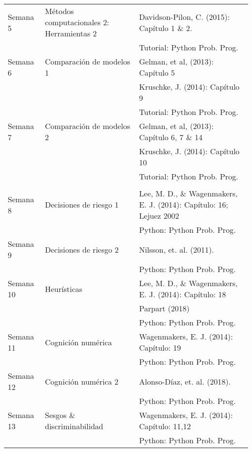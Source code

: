 \documentclass[letterpaper]{inzane_syllabus} %
\begin{document}
\begin{center}
\begin{tabularx}{\textwidth}{p{2cm}p{8cm}p{9.5cm}}
\arrayrulecolor{maingray}\hline
Semana 5 & Métodos computacionales 2: Herramientas 2  & Davidson-Pilon, C. (2015): Capítulo 1 \& 2. \\ &  & Tutorial:  Python Prob. Prog. \\ 

\arrayrulecolor{maingray}\hline
Semana 6 &  Comparaci\'on de modelos 1  & Gelman, et al, (2013): Cap\'itulo 5 \\ & & Kruschke, J. (2014): Cap\'itulo 9 \\  & & Tutorial: Python Prob. Prog. \\

\arrayrulecolor{maingray}\hline
Semana 7 & Comparaci\'on de modelos 2 & Gelman, et al, (2013): Cap\'itulo 6, 7 \& 14 \\ & & Kruschke, J. (2014): Cap\'itulo 10 \\ & & Tutorial:  Python Prob. Prog. \\


 \arrayrulecolor{myCOLOR}\hline
\multicolumn{2}{l}{\textbf{\textcolor{myCOLOR}{\large MODULO 2:  Cognici\'on Bayesiana }}} \\
\hline
 Semana 8 & Decisiones de riesgo 1 & Lee, M. D., \& Wagenmakers, E. J. (2014): Cap\'itulo: 16; Lejuez 2002 \\ & & Python: Python Prob. Prog. \\
 
 \arrayrulecolor{maingray}\hline
Semana 9 & Decisiones de riesgo 2 & Nilsson, et. al. (2011). \\ & & Python: Python Prob. Prog. \\

\arrayrulecolor{maingray}\hline
Semana 10 & Heur\'isticas  & Lee, M. D., \& Wagenmakers, E. J. (2014): Cap\'itulo: 18 \\ & & Parpart (2018) \\ & & Python: Python Prob. Prog. \\

\arrayrulecolor{maingray}\hline
Semana 11 & Cognici\'on num\'erica & Wagenmakers, E. J. (2014): Cap\'itulo: 19  \\ & & Python: Python Prob. Prog. \\

 \arrayrulecolor{maingray}\hline
Semana 12 & Cognici\'on num\'erica 2 & Alonso-Díaz, et. al. (2018). \\ & & Python: Python Prob. Prog. \\

\arrayrulecolor{maingray}\hline
Semana 13 & Sesgos \& discriminabilidad  & Wagenmakers, E. J. (2014): Cap\'itulo: 11,12  \\ & & Python: Python Prob. Prog. \\


\end{tabularx}
\end{center}
\end{document}

